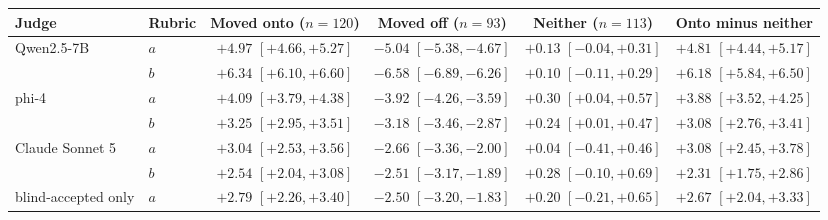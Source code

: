 \begin{tabular}{llcccc}
\toprule
Judge & Rubric & Moved onto ($n{=}120$) & Moved off ($n{=}93$) & Neither ($n{=}113$) & Onto minus neither \\
\midrule
Qwen2.5-7B & $a$ & $+4.97$ {\scriptsize$[+4.66,+5.27]$} & $-5.04$ {\scriptsize$[-5.38,-4.67]$} & $+0.13$ {\scriptsize$[-0.04,+0.31]$} & $+4.81$ {\scriptsize$[+4.44,+5.17]$} \\
 & $b$ & $+6.34$ {\scriptsize$[+6.10,+6.60]$} & $-6.58$ {\scriptsize$[-6.89,-6.26]$} & $+0.10$ {\scriptsize$[-0.11,+0.29]$} & $+6.18$ {\scriptsize$[+5.84,+6.50]$} \\
phi-4 & $a$ & $+4.09$ {\scriptsize$[+3.79,+4.38]$} & $-3.92$ {\scriptsize$[-4.26,-3.59]$} & $+0.30$ {\scriptsize$[+0.04,+0.57]$} & $+3.88$ {\scriptsize$[+3.52,+4.25]$} \\
 & $b$ & $+3.25$ {\scriptsize$[+2.95,+3.51]$} & $-3.18$ {\scriptsize$[-3.46,-2.87]$} & $+0.24$ {\scriptsize$[+0.01,+0.47]$} & $+3.08$ {\scriptsize$[+2.76,+3.41]$} \\
Claude Sonnet 5 & $a$ & $+3.04$ {\scriptsize$[+2.53,+3.56]$} & $-2.66$ {\scriptsize$[-3.36,-2.00]$} & $+0.04$ {\scriptsize$[-0.41,+0.46]$} & $+3.08$ {\scriptsize$[+2.45,+3.78]$} \\
 & $b$ & $+2.54$ {\scriptsize$[+2.04,+3.08]$} & $-2.51$ {\scriptsize$[-3.17,-1.89]$} & $+0.28$ {\scriptsize$[-0.10,+0.69]$} & $+2.31$ {\scriptsize$[+1.75,+2.86]$} \\
\quad blind-accepted only & $a$ & $+2.79$ {\scriptsize$[+2.26,+3.40]$} & $-2.50$ {\scriptsize$[-3.20,-1.83]$} & $+0.20$ {\scriptsize$[-0.21,+0.65]$} & $+2.67$ {\scriptsize$[+2.04,+3.33]$} \\
\bottomrule
\end{tabular}
